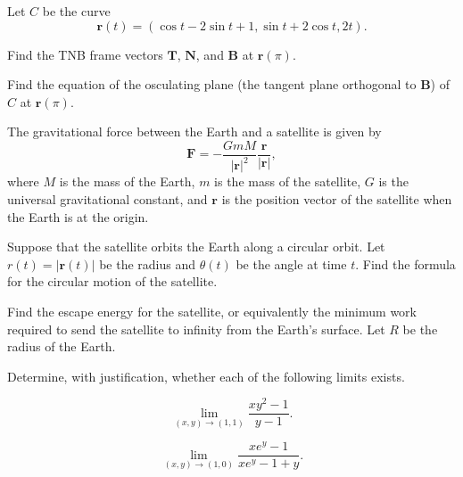 \begin{problem}
Let $C$ be the curve
\[
\mathbf r(t)
=(\cos t-2\sin t+1,\sin t+2\cos t,2t).
\]
\begin{problemsubparts}
\item Find the TNB frame vectors $\mathbf T$, $\mathbf N$, and $\mathbf B$ at $\mathbf r(\pi)$.
\item Find the equation of the osculating plane (the tangent plane orthogonal to $\mathbf B$) of $C$ at $\mathbf r(\pi)$.
\end{problemsubparts}
\end{problem}

\begin{problem}
The gravitational force between the Earth and a satellite is given by
\[
\mathbf F
=-\frac{GmM}{|\mathbf r|^2}\frac{\mathbf r}{|\mathbf r|},
\]
where $M$ is the mass of the Earth, $m$ is the mass of the satellite, $G$ is the universal gravitational constant, and $\mathbf r$ is the position vector of the satellite when the Earth is at the origin.
\begin{problemsubparts}
\item Suppose that the satellite orbits the Earth along a circular orbit. Let $r(t)=|\mathbf r(t)|$ be the radius and $\theta(t)$ be the angle at time $t$. Find the formula for the circular motion of the satellite.
\item Find the escape energy for the satellite, or equivalently the minimum work required to send the satellite to infinity from the Earth's surface. Let $R$ be the radius of the Earth.
\end{problemsubparts}
\end{problem}

\begin{problem}
Determine, with justification, whether each of the following limits exists.
\begin{problemsubparts}
\item
\[
\lim_{(x,y)\to(1,1)}\frac{xy^2-1}{y-1}.
\]
\item
\[
\lim_{(x,y)\to(1,0)}\frac{xe^y-1}{xe^y-1+y}.
\]
\end{problemsubparts}
\end{problem}

